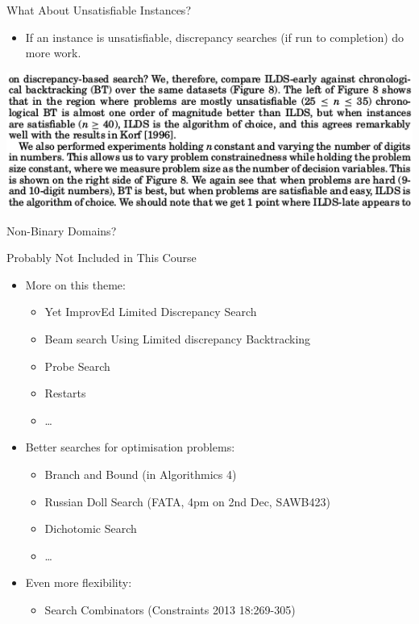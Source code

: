 \documentclass{beamer}
\begin{document}
\begin{frame}{What About Unsatisfiable Instances?}

    \begin{itemize}
        \item If an instance is unsatisfiable, discrepancy searches (if run to completion) do more
            work.
    \end{itemize}

    \vspace{1em}

    \centering\includegraphics*[keepaspectratio=true,scale=0.4]{ldsr-bt.png}
    \vspace{0em}

\end{frame}


\begin{frame}{Non-Binary Domains?}
\end{frame}

\begin{frame}{Probably Not Included in This Course}
    \begin{itemize}
        \item More on this theme:
            \begin{itemize}
                \item Yet ImprovEd Limited Discrepancy Search
                \item Beam search Using Limited discrepancy Backtracking
                \item Probe Search
                \item Restarts
                \item \ldots
            \end{itemize}
        \item Better searches for optimisation problems:
            \begin{itemize}
                \item Branch and Bound (in Algorithmics 4)
                \item Russian Doll Search (FATA, 4pm on 2nd Dec, SAWB423)
                \item Dichotomic Search
                \item \ldots
            \end{itemize}
        \item Even more flexibility:
            \begin{itemize}
                \item Search Combinators (Constraints 2013 18:269-305)
            \end{itemize}
    \end{itemize}
\end{frame}
\end{document}
